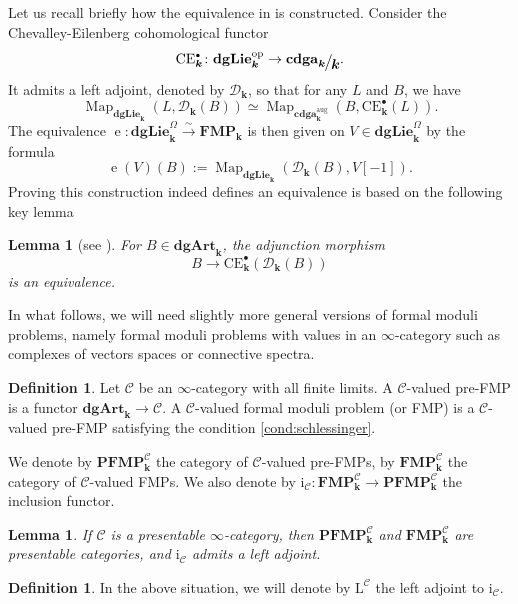 \documentclass[JEP,XML,SOM,Unicode,NoEqCountersInSection]{cedram}
\let\mathcal\mathscr
\let\autoref\Cref
\newcommand{\isom}{\stackrel{\sim}{\longrightarrow}}
\newcounter{condition}
\newcommand{\sbullet}{{\scriptscriptstyle\bullet}}
\newtheorem{lem}[thm]{Lemma}
\theoremstyle{definition}
\newtheorem{df}[thm]{Definition}
\newcommand{\op}{^{\mathrm{op}}}
\newcommand{\Cc}{\mathcal{C}}
\newcommand{\Dd}{\mathcal{D}}
\newcommand{\cdgaunbounded}{\mathbf{cdga}}
\newcommand{\dgArt}{\mathbf{dgArt}}
\newcommand{\dgLie}{\mathbf{dgLie}}
\DeclareMathOperator{\Map}{Map}
\newcommand{\quot}[2]{\ensuremath \mathchoice {\displaystyle #1 \raisebox{-2pt}{$\displaystyle \hspace{-1pt}{\big/} $} \raisebox{-4pt}{$\displaystyle \hspace{-1pt}{#2}$}}{\textstyle #1 \raisebox{-1pt}{$\textstyle \hspace{-1pt}{/} $} \raisebox{-2pt}{$\textstyle \hspace{-1pt}{#2}$}}{\scriptstyle #1 \raisebox{-1pt}{$\scriptstyle \hspace{-1pt}{/} $} \raisebox{-2pt}{$\scriptstyle \hspace{-1pt}{#2}$}}{\scriptscriptstyle #1 \raisebox{-1pt}{$\scriptscriptstyle \hspace{-1pt}{/} $} \raisebox{-2pt}{$\scriptscriptstyle \hspace{-1pt}{#2}$}}}
\newcommand{\FMP}{\mathbf{FMP}}
\renewcommand{\k}{{\boldsymbol{k}}}
\newcommand{\e}{\operatorname{e}}
\newcommand{\iC}{\operatorname{i_\Cc}}
\newcommand{\LC}{\operatorname{L^\Cc}}
\newcommand{\CE}{\mathrm{CE}}
\newcommand{\PFMP}{\mathbf{PFMP}}
\begin{document}
Let us recall briefly how the equivalence in \autoref{thm:pridhamlurie} is constructed.
Consider the Chevalley-Eilenberg cohomological functor
\[
\CE^\sbullet_\k \colon \dgLie\op_\k \to \quot{\cdgaunbounded_\k}{\k}.
\]
It admits a left adjoint, denoted by $\Dd_\k$, so that for any $L$ and $B$, we have
\[
\Map_{\dgLie_\k}(L, \Dd_\k(B)) \simeq \Map_{\cdgaunbounded_\k^\mathrm{aug}}(B, \CE^\sbullet_\k(L)).
\]
The equivalence $\e \colon \dgLie_\k^\Omega \isom \FMP_\k$ is then given on $V \in \dgLie_\k^\Omega$ by the formula
\[
\e(V)(B) := \Map_{\dgLie_\k}(\Dd_\k(B), V[-1]).
\]
Proving this construction indeed defines an equivalence is based on the following key lemma
\begin{lem}[see{ \cite[2.3.5]{lurie:dagx}}]\label{lem:BsimCDB}
For $B \in \dgArt_\k$, the adjunction morphism
\[
B \to \CE^\sbullet_\k(\Dd_\k(B))
\]
is an equivalence.
\end{lem}

In what follows, we will need slightly more general versions of formal moduli problems, namely formal moduli problems with values in an $\infty$-category such as complexes of vectors spaces or connective spectra.
\begin{df}\label{df:FMPC}
Let $\Cc$ be an $\infty$-category with all finite limits.
A $\Cc$-valued pre-FMP is a functor $\dgArt_\k \to \Cc$. A $\Cc$-valued formal moduli problem (or FMP) is a $\Cc$-valued pre-FMP satisfying the condition \eqref{cond:schlessinger}.

We denote by $\PFMP^\Cc_\k$ the category of $\Cc$-valued pre-FMPs, by $\FMP^\Cc_\k$ the category of $\Cc$-valued FMPs. We also denote by $\iC \colon \FMP^\Cc_\k \to \PFMP^\Cc_\k$ the inclusion functor.
\end{df}

\begin{lem}\label{lem:iCleftadjoint}
If $\Cc$ is a presentable $\infty$-category, then $\PFMP_\k^\Cc$ and $\FMP_\k^\Cc$ are presentable categories, and $\iC$ admits a left adjoint.
\end{lem}

\begin{df}
In the above situation, we will denote by $\LC$ the left adjoint to $\iC$.
\end{df}
\end{document}
